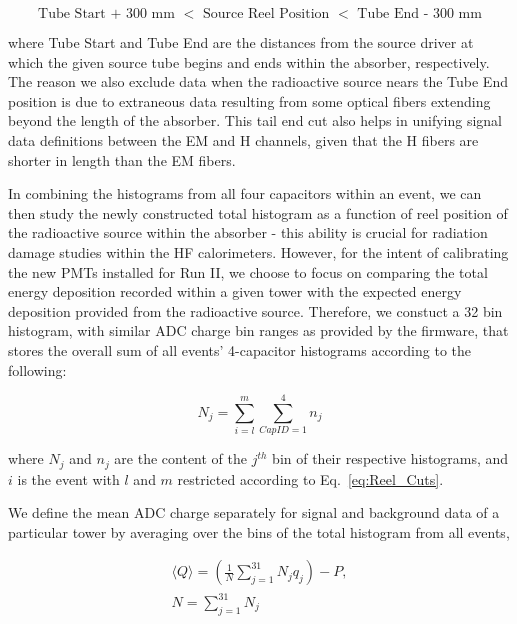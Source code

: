 \begin{center}
   \begin{equation}
      \label{eq:Reel_Cuts}
      \textrm{Tube Start + 300 mm $<$ Source Reel Position $<$ Tube End - 300 mm}
   \end{equation}
\end{center}

where Tube Start and Tube End are the distances from the source driver at
which the given source tube begins and ends within the absorber, respectively.
The reason we also exclude data when the radioactive source nears the Tube End
position is due to extraneous data resulting from some optical fibers extending
beyond the length of the absorber. This tail end cut also helps in unifying
signal data definitions between the EM and H channels, given that the H fibers
are shorter in length than the EM fibers.

In combining the histograms from all four capacitors within an event, we can
then study the newly constructed total histogram as a function of reel position
of the radioactive source within the absorber - this ability is crucial for
radiation damage studies within the HF calorimeters. However, for the intent of
calibrating the new PMTs installed for Run II, we choose to focus on comparing
the total energy deposition recorded within a given tower with the expected
energy deposition provided from the radioactive source. Therefore, we constuct
a 32 bin histogram, with similar ADC charge bin ranges as provided by the
firmware, that stores the overall sum of all events' 4-capacitor histograms
according to the following:

\begin{center}
   \begin{equation}
      \label{eq:Histo_Sum}
      N_j = \sum\limits_{i=l}^m \sum\limits_{CapID=1}^4 n_j
   \end{equation}
\end{center}

where $N_j$ and $n_j$ are the content of the $j^{th}$ bin of their respective
histograms, and $i$ is the event with $l$ and $m$ restricted according to
Eq.~\ref{eq:Reel_Cuts}.

We define the mean ADC charge separately for signal and background data of a
particular tower by averaging over the bins of the total histogram from all
events,

\begin{center}
   \begin{eqnarray}
      \label{eq:Histo_Avg}
      \langle{Q}\rangle = (\frac{1}{N} \sum\limits_{j=1}^{31} N_{j}q_{j}) - P, \\
      N = \sum\limits_{j=1}^{31} N_j \nonumber
   \end{eqnarray}
\end{center}

